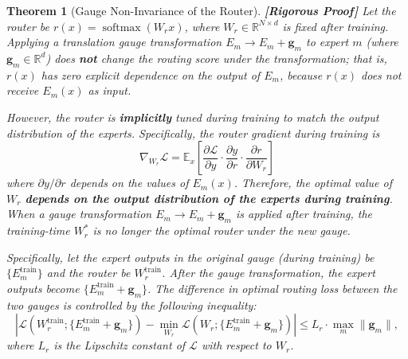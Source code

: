 \documentclass[12pt,a4paper]{article}
\newtheorem{theorem}{Theorem}[section]
\theoremstyle{remark}
\newcommand{\R}{\mathbb{R}}
\newcommand{\E}{\mathbb{E}}
\newcommand{\loss}{\mathcal{L}}
\DeclareMathOperator{\softmax}{softmax}
\newcommand{\rigorFull}{\textnormal{\textbf{[Rigorous Proof]}}}
\begin{document}
\begin{theorem}[Gauge Non-Invariance of the Router]\label{thm:noninvariance}\rigorFull
Let the router be $r(x) = \softmax(W_r x)$, where $W_r \in \R^{N \times d}$ is fixed after training. Applying a translation gauge transformation $E_m \to E_m + \mathbf{g}_m$ to expert $m$ (where $\mathbf{g}_m \in \R^d$) does \textbf{not} change the routing score under the transformation; that is, $r(x)$ has zero explicit dependence on the output of $E_m$, because $r(x)$ does not receive $E_m(x)$ as input.

However, the router is \textbf{implicitly} tuned during training to match the output distribution of the experts. Specifically, the router gradient during training is
\begin{equation}
    \nabla_{W_r} \loss = \E_x\left[ \frac{\partial \loss}{\partial y} \cdot \frac{\partial y}{\partial r} \cdot \frac{\partial r}{\partial W_r} \right]
\end{equation}
where $\partial y / \partial r$ depends on the values of $E_m(x)$. Therefore, the optimal value of $W_r$ \textbf{depends on the output distribution of the experts during training}. When a gauge transformation $E_m \to E_m + \mathbf{g}_m$ is applied after training, the training-time $W_r^*$ is no longer the optimal router under the new gauge.

Specifically, let the expert outputs in the original gauge (during training) be $\{E_m^{\text{train}}\}$ and the router be $W_r^{\text{train}}$. After the gauge transformation, the expert outputs become $\{E_m^{\text{train}} + \mathbf{g}_m\}$. The difference in optimal routing loss between the two gauges is controlled by the following inequality:
\begin{equation}
    \left|\loss(W_r^{\text{train}}; \{E_m^{\text{train}} + \mathbf{g}_m\}) - \min_{W_r} \loss(W_r; \{E_m^{\text{train}} + \mathbf{g}_m\})\right| \leq L_r \cdot \max_m \|\mathbf{g}_m\|,
\end{equation}
where $L_r$ is the Lipschitz constant of $\loss$ with respect to $W_r$.
\end{theorem}
\end{document}
